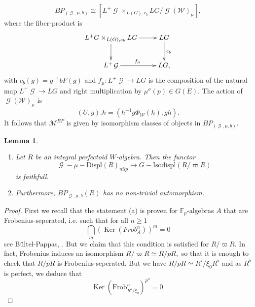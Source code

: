 \documentclass[a4paper,10,5 pt]{amsart}
\newtheorem{Lemma}[Satz]{Lemma}
\theoremstyle{definition}
\DeclareMathOperator{\Ker}{Ker}
\DeclareMathOperator{\G}{\mathcal{G}}
\begin{document}
$$
 BP_{(\G,\mu,b)}\cong [L^{+}\G\times_{L(G),c_{b}} LG/\G(\mathcal{W})_{\mu}],
$$
where the fiber-product is
$$
\xymatrix{
L^{+}G\times_{L(G),c_{b}} LG \ar[r] \ar[d] & LG \ar[d]^{c_{b}} \\
L^{+}\G \ar[r]^{f_{\mu}} & LG,
}
$$
with $c_{b}(g)=g^{-1}bF(g)$ and $f_{\mu}\colon L^{+}\G \rightarrow LG$ is the composition of the natural map $L^{+}\G\rightarrow LG$ and right multiplication by $\mu^{\sigma}(p)\in G(E).$ The action of $\G(\mathcal{W})_{\mu}$ is
$$
(U,g).h=(h^{-1}g\Phi_{\mathcal{W}}(h),gh).
$$
It follows that $\mathcal{M}^{BP}$ is given by isomorphism classes of objects in $BP_{(\G,\mu,b)}.$
\begin{Lemma}
\begin{enumerate}
\item[(a):] Let $R$ be an integral perfectoid $W$-algebra. Then the functor 
$$\G-\mu-\text{Displ}(R)_{nilp} \rightarrow G-\text{Isodispl}(R/\varpi R)$$ is faithfull.
\item[(b):]  Furthermore, $BP_{\G,\mu,b}(R)$ has no non-trivial automorphism.
\end{enumerate}
\end{Lemma}
\begin{proof}
First we recall that the statement (a) is proven for $\mathbb{F}_{p}$-algebras $A$ that are Frobenius-seperated, i.e. such that for all $n\geq 1$
$$
\bigcap_{m}(\Ker(Frob_{A}^{n}))^{m}=0
$$
see Bültel-Pappas, \cite[Prop. 3.6.1.]{BP}. But we claim that this condition is satisfied for $R/\varpi R.$ In fact, Frobenius induces an isomorphism $R/\varpi R\simeq R/pR,$ so that it is enough to check that $R/pR$ is Frobenius-seperated. But we have $R/pR\simeq R^{\flat}/\xi_{0}R^{\flat}$ and as $R^{\flat}$ is perfect, we deduce that
$$
\Ker(\text{Frob}^{n}_{R^{\flat}/\xi_{0}})^{p^{n}}=0.
$$
\end{proof}
\end{document}
